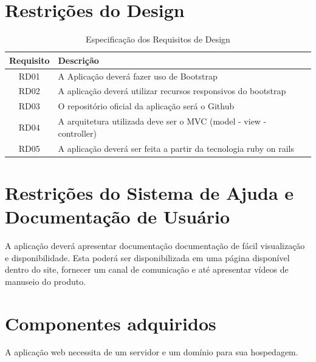 \begin{apendicesenv}
{\large {\section { Restrições do Design \\ } } }

\begin{table}[H]
                \centering
                \caption{Especificação dos Requisitos de Design}
                \begin{tabular}{c|p{10cm}}
                    \hline
                    \textbf{Requisito} & \textbf{Descrição}\\
                    \hline
                    RD01 & A Aplicação deverá fazer uso de Bootstrap\\
                    \hline
                    RD02 & A aplicação deverá utilizar recursos responsivos do bootstrap\\
                    \hline
                    RD03 & O repositório oficial da aplicação será o Github\\
                    \hline
                    RD04 & A arquitetura utilizada deve ser o MVC (model - view - controller)\\
                    \hline
                    RD05 &  A aplicação deverá ser feita a  partir da tecnologia ruby on rails\\
                    \hline
                \end{tabular}
            \end{table}

{\large {\section { Restrições do Sistema de Ajuda e Documentação de Usuário \\ } } }

A aplicação deverá apresentar documentação documentação de fácil visualização e disponibilidade. Esta poderá ser disponibilizada em uma página disponível dentro do site, fornecer um canal de comunicação e  até apresentar vídeos de manuseio do produto.\\

{\large {\section { Componentes adquiridos \\ } } }

A aplicação web necessita de um servidor e um domínio para sua hospedagem.\\


\end{apendicesenv}
